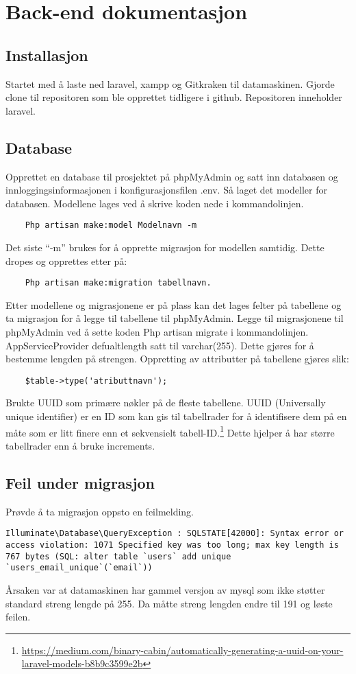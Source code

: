 \clearpage
\section{Back-end dokumentasjon}
\subsection{Installasjon}
Startet med å laste ned laravel, xampp og Gitkraken til datamaskinen. Gjorde clone til repositoren som ble opprettet tidligere i github. Repositoren inneholder laravel. 

\subsection{Database}
Opprettet en database til prosjektet på phpMyAdmin og satt inn databasen og innloggingsinformasjonen i konfigurasjonsfilen .env. Så laget det modeller for databasen. Modellene lages ved å skrive koden nede i kommandolinjen. 
\begin{lstlisting}
    Php artisan make:model Modelnavn -m
\end{lstlisting}  
Det siste “-m” brukes for å opprette migrasjon for modellen  samtidig. Dette dropes og opprettes etter på: 
 \begin{lstlisting}   
    Php artisan make:migration tabellnavn.
\end{lstlisting}
Etter modellene og migrasjonene er på plass kan det lages felter på tabellene og ta migrasjon for å legge til tabellene til phpMyAdmin. Legge til migrasjonene til phpMyAdmin ved å sette koden Php artisan migrate  i kommandolinjen.
AppServiceProvider defualtlength satt til varchar(255). Dette gjøres for å bestemme lengden på strengen.
Oppretting av  attributter på tabellene gjøres slik: 

\begin{lstlisting}
    $table->type('atributtnavn');
\end{lstlisting}

Brukte UUID som primære nøkler på de fleste  tabellene.  UUID (Universally unique identifier) er en ID som kan gis til tabellrader for å identifisere dem på en måte som er litt finere enn et sekvensielt tabell-ID.\footnote{\url{https://medium.com/binary-cabin/automatically-generating-a-uuid-on-your-laravel-models-b8b9c3599e2b}} Dette hjelper å har større tabellrader enn å bruke increments.

\subsection{Feil under migrasjon}
Prøvde å ta migrasjon oppsto en feilmelding.
\begin{lstlisting}
Illuminate\Database\QueryException : SQLSTATE[42000]: Syntax error or access violation: 1071 Specified key was too long; max key length is 767 bytes (SQL: alter table `users` add unique `users_email_unique`(`email`))
\end{lstlisting}
Årsaken var at datamaskinen har gammel versjon av mysql som ikke støtter standard streng lengde på 255. Da måtte streng lengden endre til 191 og løste feilen.

